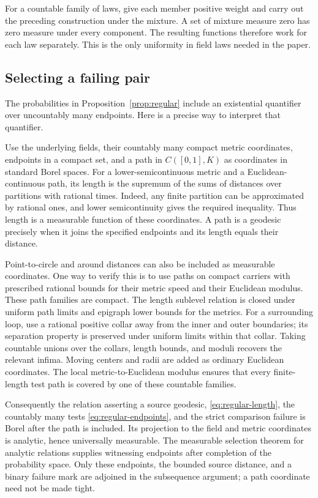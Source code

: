 \documentclass[11pt]{article}
\theoremstyle{definition}
\theoremstyle{remark}
\begin{document}
For a countable family of laws, give each member positive
weight and carry out the preceding construction under the
mixture. A set of mixture measure zero has zero measure under
every component. The resulting functions therefore work for
each law separately. This is the only uniformity in field
laws needed in the paper.

\subsection{Selecting a failing pair}\label{app:selection}
The probabilities in Proposition~\ref{prop:regular} include
an existential quantifier over uncountably many endpoints.
Here is a precise way to interpret that quantifier.

Use the underlying fields, their countably many compact metric
coordinates, endpoints in a compact set, and a path in
$C([0,1],K)$ as coordinates in standard Borel spaces. For a
lower-semicontinuous metric and a Euclidean-continuous path,
its length is the supremum of the sums of distances over
partitions with rational times. Indeed, any finite partition
can be approximated by rational ones, and lower
semicontinuity gives the required inequality. Thus length
is a measurable function of these coordinates. A path is a
geodesic precisely when it joins the specified endpoints and
its length equals their distance.

Point-to-circle and around distances can also be included as
measurable coordinates. One way to verify this is to use
paths on compact carriers with prescribed rational bounds
for their metric speed and their Euclidean modulus. These
path families are compact. The length sublevel relation is
closed under uniform path limits and epigraph lower bounds
for the metrics. For a surrounding loop, use a rational
positive collar away from the inner and outer boundaries;
its separation property is preserved under uniform limits
within that collar. Taking countable unions over
the collars, length bounds, and moduli recovers the relevant
infima. Moving centers and radii are added as ordinary
Euclidean coordinates. The local metric-to-Euclidean modulus
ensures that every finite-length test path is covered by
one of these countable families.

Consequently the relation asserting a source geodesic,
\eqref{eq:regular-length}, the countably many tests
\eqref{eq:regular-endpoints}, and the strict comparison
failure is Borel after the path is included. Its projection
to the field and metric coordinates is analytic, hence
universally measurable. The measurable selection theorem
for analytic relations supplies witnessing endpoints after
completion of the probability space. Only these endpoints,
the bounded source distance, and a binary failure mark are
adjoined in the subsequence argument; a path coordinate
need not be made tight.
\end{document}
